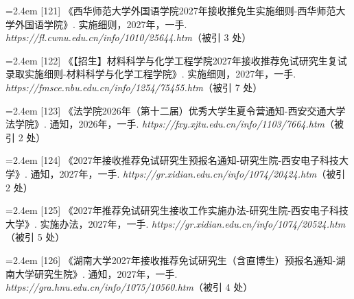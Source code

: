 {\noindent\hangindent=2.4em \label{src:S0152}{\color{cAccent}[121]} 《西华师范大学外国语学院2027年接收推免生实施细则-西华师范大学外国语学院》. 实施细则，2027年，一手. \textit{https://fl.cwnu.edu.cn/info/1010/25644.htm}（被引 3 处）\par
\vspace{0.6pt}
\vspace{3.5pt}\par
\nopagebreak\vspace{1pt}
\noindent\hangindent=2.4em \label{src:S0153}{\color{cAccent}[122]} 《【招生】材料科学与化学工程学院2027年接收推荐免试研究生复试录取实施细则-材料科学与化学工程学院》. 实施细则，2027年，一手. \textit{https://fmsce.nbu.edu.cn/info/1254/75455.htm}（被引 7 处）\par
\vspace{0.6pt}
\vspace{3.5pt}\par
\nopagebreak\vspace{1pt}
\noindent\hangindent=2.4em \label{src:S0154}{\color{cAccent}[123]} 《法学院2026年（第十二届）优秀大学生夏令营通知-西安交通大学法学院》. 通知，2026年，一手. \textit{https://fxy.xjtu.edu.cn/info/1103/7664.htm}（被引 2 处）\par
\vspace{0.6pt}
\vspace{3.5pt}\par
\nopagebreak\vspace{1pt}
\noindent\hangindent=2.4em \label{src:S0156}{\color{cAccent}[124]} 《2027年接收推荐免试研究生预报名通知-研究生院-西安电子科技大学》. 通知，2027年，一手. \textit{https://gr.xidian.edu.cn/info/1074/20424.htm}（被引 2 处）\par
\vspace{0.6pt}
\noindent\hangindent=2.4em \label{src:S0157}{\color{cAccent}[125]} 《2027年推荐免试研究生接收工作实施办法-研究生院-西安电子科技大学》. 实施办法，2027年，一手. \textit{https://gr.xidian.edu.cn/info/1074/20524.htm}（被引 5 处）\par
\vspace{0.6pt}
\vspace{3.5pt}\par
\nopagebreak\vspace{1pt}
\noindent\hangindent=2.4em \label{src:S0158}{\color{cAccent}[126]} 《湖南大学2027年接收推荐免试研究生（含直博生）预报名通知-湖南大学研究生院》. 通知，2027年，一手. \textit{https://gra.hnu.edu.cn/info/1075/10560.htm}（被引 4 处）\par
}
